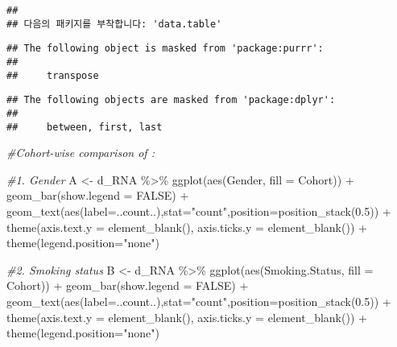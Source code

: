 \documentclass[
]{article}
\newenvironment{Shaded}{\begin{snugshade}}{\end{snugshade}}
\newcommand{\AttributeTok}[1]{\textcolor[rgb]{0.77,0.63,0.00}{#1}}
\newcommand{\CommentTok}[1]{\textcolor[rgb]{0.56,0.35,0.01}{\textit{#1}}}
\newcommand{\ConstantTok}[1]{\textcolor[rgb]{0.00,0.00,0.00}{#1}}
\newcommand{\FloatTok}[1]{\textcolor[rgb]{0.00,0.00,0.81}{#1}}
\newcommand{\FunctionTok}[1]{\textcolor[rgb]{0.00,0.00,0.00}{#1}}
\newcommand{\NormalTok}[1]{#1}
\newcommand{\OtherTok}[1]{\textcolor[rgb]{0.56,0.35,0.01}{#1}}
\newcommand{\SpecialCharTok}[1]{\textcolor[rgb]{0.00,0.00,0.00}{#1}}
\newcommand{\StringTok}[1]{\textcolor[rgb]{0.31,0.60,0.02}{#1}}
\begin{document}
\begin{verbatim}
## 
## 다음의 패키지를 부착합니다: 'data.table'
\end{verbatim}

\begin{verbatim}
## The following object is masked from 'package:purrr':
## 
##     transpose
\end{verbatim}

\begin{verbatim}
## The following objects are masked from 'package:dplyr':
## 
##     between, first, last
\end{verbatim}

\begin{Shaded}
\begin{Highlighting}[]
\CommentTok{\#Cohort{-}wise comparison of :}

\CommentTok{\#1. Gender}
\NormalTok{A }\OtherTok{\textless{}{-}}\NormalTok{ d\_RNA }\SpecialCharTok{\%\textgreater{}\%}
  \FunctionTok{ggplot}\NormalTok{(}\FunctionTok{aes}\NormalTok{(Gender, }\AttributeTok{fill =}\NormalTok{ Cohort)) }\SpecialCharTok{+} 
  \FunctionTok{geom\_bar}\NormalTok{(}\AttributeTok{show.legend =} \ConstantTok{FALSE}\NormalTok{) }\SpecialCharTok{+}
  \FunctionTok{geom\_text}\NormalTok{(}\FunctionTok{aes}\NormalTok{(}\AttributeTok{label=}\NormalTok{..count..),}\AttributeTok{stat=}\StringTok{"count"}\NormalTok{,}\AttributeTok{position=}\FunctionTok{position\_stack}\NormalTok{(}\FloatTok{0.5}\NormalTok{)) }\SpecialCharTok{+}
  \FunctionTok{theme}\NormalTok{(}\AttributeTok{axis.text.y =} \FunctionTok{element\_blank}\NormalTok{(),}
        \AttributeTok{axis.ticks.y =} \FunctionTok{element\_blank}\NormalTok{()) }\SpecialCharTok{+} 
  \FunctionTok{theme}\NormalTok{(}\AttributeTok{legend.position=}\StringTok{"none"}\NormalTok{)}

\CommentTok{\#2. Smoking status}
\NormalTok{B }\OtherTok{\textless{}{-}}\NormalTok{ d\_RNA }\SpecialCharTok{\%\textgreater{}\%}
 \FunctionTok{ggplot}\NormalTok{(}\FunctionTok{aes}\NormalTok{(Smoking.Status, }\AttributeTok{fill =}\NormalTok{ Cohort)) }\SpecialCharTok{+} 
  \FunctionTok{geom\_bar}\NormalTok{(}\AttributeTok{show.legend =} \ConstantTok{FALSE}\NormalTok{) }\SpecialCharTok{+}
  \FunctionTok{geom\_text}\NormalTok{(}\FunctionTok{aes}\NormalTok{(}\AttributeTok{label=}\NormalTok{..count..),}\AttributeTok{stat=}\StringTok{"count"}\NormalTok{,}\AttributeTok{position=}\FunctionTok{position\_stack}\NormalTok{(}\FloatTok{0.5}\NormalTok{)) }\SpecialCharTok{+}
  \FunctionTok{theme}\NormalTok{(}\AttributeTok{axis.text.y =} \FunctionTok{element\_blank}\NormalTok{(),}
        \AttributeTok{axis.ticks.y =} \FunctionTok{element\_blank}\NormalTok{()) }\SpecialCharTok{+} 
  \FunctionTok{theme}\NormalTok{(}\AttributeTok{legend.position=}\StringTok{"none"}\NormalTok{)}


\end{Highlighting}
\end{Shaded}
\end{document}
